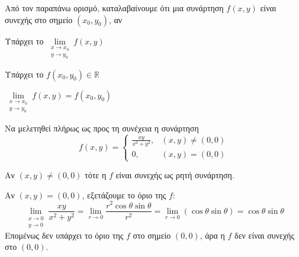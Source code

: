 \documentclass[a4paper,11pt]{report}
\begin{document}
\begin{rem}
  Από τον παραπάνω ορισμό, καταλαβαίνουμε ότι μια συνάρτηση $ f(x,y) $ 
  είναι συνεχής στο σημείο $ (x_{0}, y_{0}) $, αν
  \begin{myitemize}
    \item Υπάρχει το $ \lim\limits_{\substack{x\to x_{0} \\y \to y_{0}}} f(x,y) $
    \item Υπάρχει το $ f(x_{0}, y_{0}) \in \mathbb{R} $
    \item $  \lim\limits_{\substack{x\to x_{0} \\ y \to y_{0}}} f(x,y) = 
      f(x_{0}, y_{0}) $
  \end{myitemize}
\end{rem}

\begin{example}
  Να μελετηθεί πλήρως ως προς τη συνέχεια η συνάρτηση 
  \[
    f(x,y) = 
    \begin{cases} 
      \frac{xy}{x^{2}+y^{2}}, & (x,y) \neq (0,0) \\ 
      0, & (x,y) = (0,0) 
    \end{cases}  
  \]
  \begin{solution}
  \item {}              
    Αν $ (x,y) \neq (0,0) $ τότε η $f$ είναι συνεχής 
    ως ρητή συνάρτηση.

    Αν $ (x,y)=(0,0) $, εξετάζουμε το όριο της $f$: 
    \[
      \lim\limits_{\substack{x\to 0 \\y \to 0}} \frac{xy}{x^{2}+y^{2}} = 
      \lim_{r \to 0} \frac{r^{2} \cos{\theta} \sin{\theta} }{ r^{2}} = 
      \lim_{r \to 0}(\cos{\theta} \sin{\theta}) = \cos{\theta} \sin{\theta} 
    \] 
    Επομένως δεν υπάρχει το όριο της $f$ στο σημείο $ (0,0) $, άρα η $f$ 
    δεν είναι συνεχής στο $ (0,0) $.
  \end{solution}
\end{example}
\end{document}
